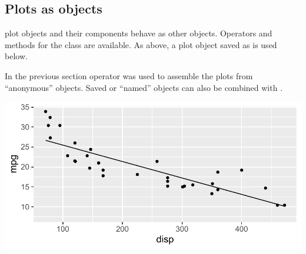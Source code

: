 \documentclass[krantz2]{krantz}\usepackage{knitr}
\begin{document}
\subsection{Plots as \Rlang objects}\label{sec:plot:objects}
 plot objects and their components behave as other \Rlang objects. Operators and methods for the  class are available. As above, a  plot object saved as  is used below.

\begin{knitrout}\footnotesize
{}\color{fgcolor}\begin{kframe}
\begin{alltt}
 \hlkwb{<-} \hlstd{(} 
              \hlstd{=} \hlstd{(}    \hlopt{+}
       \hlstd{()}
\end{alltt}
\end{kframe}
\end{knitrout}

In the previous section operator \code{+} was used to assemble the plots from ``anonymous'' \Rlang objects. Saved or ``named'' objects can also be combined with \code{+}.

\begin{knitrout}\footnotesize
{}\color{fgcolor}\begin{kframe}
\begin{alltt}
 \hlopt{+} \hlstd{(} \hlstd{=} \hlstd{,}  \hlstd{=} \hlstd{,}   \hlopt{~} 
\end{alltt}
\end{kframe}

{\centering \includegraphics[width=.7\textwidth]{figure/pos-ggplot-objects-02-1} 

}


\end{knitrout}
\end{document}
